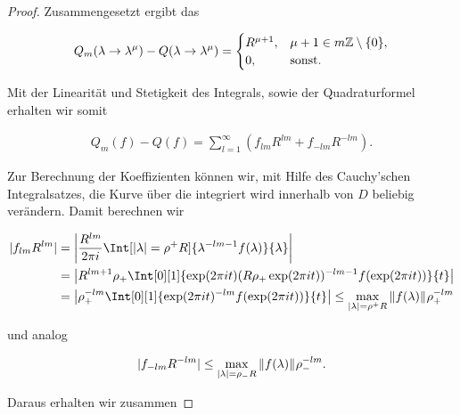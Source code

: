 \begin{proof}
    Zusammengesetzt ergibt das

    \begin{align*}
        Q_m(\lambda \to \lambda^\mu) - Q(\lambda \to \lambda^\mu)
        =
        \begin{cases}
            R^{\mu + 1}, & \mu + 1 \in m \mathbb{Z} \setminus {\left \{ 0 \right \}}, \\
            0,           & \text{sonst}.
        \end{cases}
    \end{align*}

    Mit der Linearität und Stetigkeit des Integrals, sowie der Quadraturformel erhalten wir somit

    \begin{align*}
        Q_m(f) - Q(f)
        =
        \sum_{l=1}^\infty
            (f_{l m}R^{l m} + f_{-l m} R^{-l m}).
    \end{align*}

    Zur Berechnung der Koeffizienten können wir, mit Hilfe des Cauchy'schen Integralsatzes, die Kurve über die integriert wird innerhalb von $D$ beliebig verändern.
    Damit berechnen wir

    \begin{align*}
        |f_{l m}R^{l m}|
        & =
        \abs
        {
            \frac{R^{l m}}{2\pi i}
            \Int[|\lambda| = \rho^+R]{\lambda^{-l m - 1} f(\lambda)}{\lambda}
        } \\
        & =
        \abs
        {
            R^{l m+1} \rho_+
            \Int[0][1]
            {
                \exp(2\pi i t)
                (R \rho_+ \exp(2 \pi i t))^{-l m -1} f(\exp(2 \pi i t))
            }{t}
        } \\
        & =
        \abs
        {
            \rho_+^{-l m}
            \Int[0][1]
            {
                \exp(2 \pi i t)^{-l m} f(\exp(2\pi i t))
            }{t}
        }
        \leq
        \max_{|\lambda| = \rho^+R}
            \norm{f(\lambda)}
            \rho_+^{-l m}
    \end{align*}

    und analog

    \begin{align*}
        |f_{-l m}R^{-l m}|
        \leq
        \max_{|\lambda| = \rho_-R}
            {\left \| f(\lambda) \right \|}_{}
            \rho_-^{-l m}.
    \end{align*}

    Daraus erhalten wir zusammen


\end{proof}
